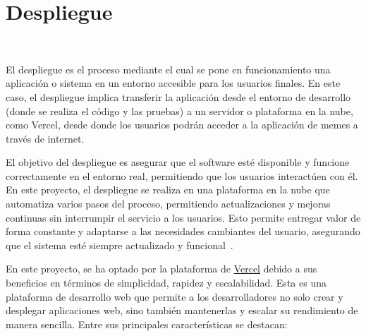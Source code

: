 \section{Despliegue}~\label{sec:despliegue}

El despliegue es el proceso mediante el cual se pone en funcionamiento una aplicación o sistema en un entorno accesible para los usuarios finales. En este caso, el despliegue implica transferir la aplicación desde el entorno de desarrollo (donde se realiza el código y las pruebas) a un servidor o plataforma en la nube, como Vercel, desde donde los usuarios podrán acceder a la aplicación de memes a través de internet.

El objetivo del despliegue es asegurar que el software esté disponible y funcione correctamente en el entorno real, permitiendo que los usuarios interactúen con él. En este proyecto, el despliegue se realiza en una plataforma en la nube que automatiza varios pasos del proceso, permitiendo actualizaciones y mejoras continuas sin interrumpir el servicio a los usuarios.  Esto permite entregar valor de forma constante y adaptarse a las necesidades cambiantes del usuario, asegurando que el sistema esté siempre actualizado y funcional~\cite{pressman2005software}.

En este proyecto, se ha optado por la plataforma de \href{https://vercel.com/home}{Vercel} debido a sus beneficios en términos de simplicidad, rapidez y escalabilidad. Esta es una plataforma de desarrollo web que permite a los desarrolladores no solo crear y desplegar aplicaciones web, sino también mantenerlas y escalar su rendimiento de manera sencilla. Entre sus principales características se destacan:

